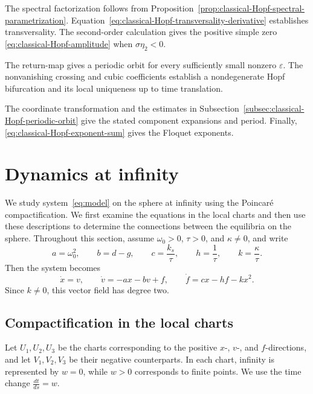 \documentclass[11pt,reqno]{amsart}
\theoremstyle{plain}
\theoremstyle{definition}
\theoremstyle{remark}
\begin{document}

The spectral factorization follows from
Proposition~\ref{prop:classical-Hopf-spectral-parametrization}.
Equation~\eqref{eq:classical-Hopf-transversality-derivative}
establishes transversality. The second-order calculation gives the positive simple zero
\eqref{eq:classical-Hopf-amplitude} when
$\sigma\eta_2<0$.

The return-map gives a periodic orbit for every sufficiently small
nonzero $\varepsilon$. The nonvanishing crossing and
cubic coefficients establish a nondegenerate Hopf
bifurcation and its local uniqueness up to time
translation.

The coordinate transformation and the estimates in
Subsection~\ref{subsec:classical-Hopf-periodic-orbit}
give the stated component expansions and period.
Finally,
\eqref{eq:classical-Hopf-exponent-sum} gives the Floquet
exponents. 

\section{Dynamics at infinity}
\label{sec:infinity}

We study system~\eqref{eq:model} on the sphere at infinity using
the Poincar\'e compactification. We first examine the equations
in the local charts and then use these descriptions to determine
the connections between the equilibria on the sphere.
Throughout this section, assume $\omega_0>0$, $\tau>0$, and
$\kappa\neq0$, and write
\[
a=\omega_0^2,\qquad b=d-g,\qquad c=\frac{k_s}{\tau},
\qquad h=\frac1\tau,\qquad k=\frac{\kappa}{\tau}.
\]
Then the system becomes
\[
\dot x=v,\qquad
\dot v=-ax-bv+f,\qquad
\dot f=cx-hf-kx^2.
\]
Since $k\neq0$, this vector field has degree two.

\subsection{Compactification in the local charts}
\label{subsec:infinity-charts}

Let $U_1,U_2,U_3$ be the charts corresponding to the positive
$x$-, $v$-, and $f$-directions, and let $V_1,V_2,V_3$ be
their negative counterparts. In each chart, infinity is
represented by $w=0$, while $w>0$ corresponds to finite points.
We use the time change
$
\frac{dt}{ds}=w.
$
\end{document}
